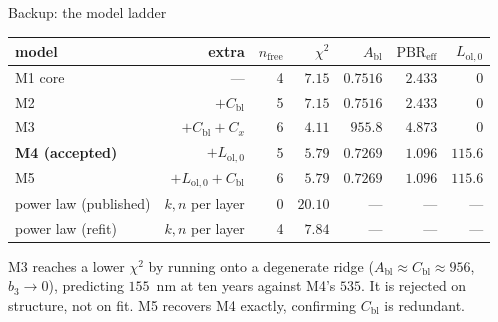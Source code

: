 \documentclass[aspectratio=169,10pt]{beamer}
\newcommand{\Abl}{A_{\mathrm{bl}}}
\newcommand{\Cbl}{C_{\mathrm{bl}}}
\newcommand{\Cx}{C_{x}}
\newcommand{\PBR}{\mathrm{PBR}_{\mathrm{eff}}}
\begin{document}
\begin{frame}{Backup: the model ladder}
\centering
\scriptsize
\begin{tabular}{lrrrrrr}
\toprule
model & extra & $n_{\mathrm{free}}$ & $\chi^2$ & $\Abl$ & $\PBR$ & $L_{\mathrm{ol},0}$ \\
\midrule
M1 core & --- & 4 & $7.15$ & $0.7516$ & $2.433$ & $0$ \\
M2 & $+\Cbl$ & 5 & $7.15$ & $0.7516$ & $2.433$ & $0$ \\
M3 & $+\Cbl+\Cx$ & 6 & $4.11$ & $955.8$ & $4.873$ & $0$ \\
\textbf{M4 (accepted)} & $+L_{\mathrm{ol},0}$ & 5 & $\mathbf{5.79}$ & $0.7269$ & $1.096$ & $115.6$ \\
M5 & $+L_{\mathrm{ol},0}+\Cbl$ & 6 & $5.79$ & $0.7269$ & $1.096$ & $115.6$ \\
power law (published) & $k,n$ per layer & 0 & $20.10$ & --- & --- & --- \\
power law (refit) & $k,n$ per layer & 4 & $7.84$ & --- & --- & --- \\
\bottomrule
\end{tabular}

\vspace{1em}
\raggedright
\small
M3 reaches a lower $\chi^2$ by running onto a degenerate ridge
($\Abl \approx \Cbl \approx 956$, $b_3 \to 0$), predicting $155$~nm at ten
years against M4's $535$. It is rejected on structure, not on fit. M5
recovers M4 exactly, confirming $\Cbl$ is redundant.
\end{frame}
\end{document}

